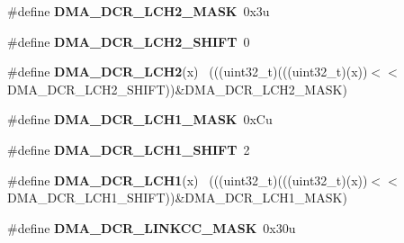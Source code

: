 \begin{DoxyCompactItemize}
\item 
\hypertarget{group___d_m_a___register___masks_ga1e5f344c33c6cb40d3c1e0761a18569f}{}\#define {\bfseries D\+M\+A\+\_\+\+D\+C\+R\+\_\+\+L\+C\+H2\+\_\+\+M\+A\+S\+K}~0x3u\label{group___d_m_a___register___masks_ga1e5f344c33c6cb40d3c1e0761a18569f}

\item 
\hypertarget{group___d_m_a___register___masks_ga4fa245f27d90146588583445b590c8da}{}\#define {\bfseries D\+M\+A\+\_\+\+D\+C\+R\+\_\+\+L\+C\+H2\+\_\+\+S\+H\+I\+F\+T}~0\label{group___d_m_a___register___masks_ga4fa245f27d90146588583445b590c8da}

\item 
\hypertarget{group___d_m_a___register___masks_gaa4c213b35b15bd572e8772cc034264be}{}\#define {\bfseries D\+M\+A\+\_\+\+D\+C\+R\+\_\+\+L\+C\+H2}(x)                                                ~(((uint32\+\_\+t)(((uint32\+\_\+t)(x))$<$$<$D\+M\+A\+\_\+\+D\+C\+R\+\_\+\+L\+C\+H2\+\_\+\+S\+H\+I\+F\+T))\&D\+M\+A\+\_\+\+D\+C\+R\+\_\+\+L\+C\+H2\+\_\+\+M\+A\+S\+K)\label{group___d_m_a___register___masks_gaa4c213b35b15bd572e8772cc034264be}

\item 
\hypertarget{group___d_m_a___register___masks_ga8d1ad8ec1d2dbb188583222b1a4d0442}{}\#define {\bfseries D\+M\+A\+\_\+\+D\+C\+R\+\_\+\+L\+C\+H1\+\_\+\+M\+A\+S\+K}~0x\+Cu\label{group___d_m_a___register___masks_ga8d1ad8ec1d2dbb188583222b1a4d0442}

\item 
\hypertarget{group___d_m_a___register___masks_ga7794ccc91b5f4ebe6e45a26f6dacb13b}{}\#define {\bfseries D\+M\+A\+\_\+\+D\+C\+R\+\_\+\+L\+C\+H1\+\_\+\+S\+H\+I\+F\+T}~2\label{group___d_m_a___register___masks_ga7794ccc91b5f4ebe6e45a26f6dacb13b}

\item 
\hypertarget{group___d_m_a___register___masks_ga26fe35b0e5ed0e30b64ad8f7254a4817}{}\#define {\bfseries D\+M\+A\+\_\+\+D\+C\+R\+\_\+\+L\+C\+H1}(x)                                                ~(((uint32\+\_\+t)(((uint32\+\_\+t)(x))$<$$<$D\+M\+A\+\_\+\+D\+C\+R\+\_\+\+L\+C\+H1\+\_\+\+S\+H\+I\+F\+T))\&D\+M\+A\+\_\+\+D\+C\+R\+\_\+\+L\+C\+H1\+\_\+\+M\+A\+S\+K)\label{group___d_m_a___register___masks_ga26fe35b0e5ed0e30b64ad8f7254a4817}

\item 
\hypertarget{group___d_m_a___register___masks_ga87b016be181c05a161edb3cf1659c85e}{}\#define {\bfseries D\+M\+A\+\_\+\+D\+C\+R\+\_\+\+L\+I\+N\+K\+C\+C\+\_\+\+M\+A\+S\+K}~0x30u\label{group___d_m_a___register___masks_ga87b016be181c05a161edb3cf1659c85e}


\end{DoxyCompactItemize}
